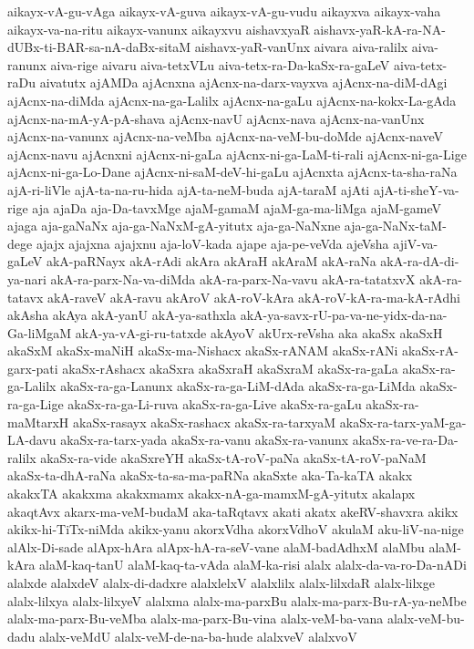 {aikayx-vA-gu-vAga
aikayx-vA-guva
aikayx-vA-gu-vudu
aikayxva
aikayx-vaha
aikayx-va-na-ritu
aikayx-vanunx
aikayxvu
aishavxyaR
aishavx-yaR-kA-ra-NA-dUBx-ti-BAR-sa-nA-daBx-sitaM
aishavx-yaR-vanUnx
aivara
aiva-ralilx
aiva-ranunx
aiva-rige
aivaru
aiva-tetxVLu
aiva-tetx-ra-Da-kaSx-ra-gaLeV
aiva-tetx-raDu
aivatutx
ajAMDa
ajAcnxna
ajAcnx-na-darx-vayxva
ajAcnx-na-diM-dAgi
ajAcnx-na-diMda
ajAcnx-na-ga-Lalilx
ajAcnx-na-gaLu
ajAcnx-na-kokx-La-gAda
ajAcnx-na-mA-yA-pA-shava
ajAcnx-navU
ajAcnx-nava
ajAcnx-na-vanUnx
ajAcnx-na-vanunx
ajAcnx-na-veMba
ajAcnx-na-veM-bu-doMde
ajAcnx-naveV
ajAcnx-navu
ajAcnxni
ajAcnx-ni-gaLa
ajAcnx-ni-ga-LaM-ti-rali
ajAcnx-ni-ga-Lige
ajAcnx-ni-ga-Lo-Dane
ajAcnx-ni-saM-deV-hi-gaLu
ajAcnxta
ajAcnx-ta-sha-raNa
ajA-ri-liVle
ajA-ta-na-ru-hida
ajA-ta-neM-buda
ajA-taraM
ajAti
ajA-ti-sheY-va-rige
aja
ajaDa
aja-Da-tavxMge
ajaM-gamaM
ajaM-ga-ma-liMga
ajaM-gameV
ajaga
aja-gaNaNx
aja-ga-NaNxM-gA-yitutx
aja-ga-NaNxne
aja-ga-NaNx-taM-dege
ajajx
ajajxna
ajajxnu
aja-loV-kada
ajape
aja-pe-veVda
ajeVsha
ajiV-va-gaLeV
akA-paRNayx
akA-rAdi
akAra
akAraH
akAraM
akA-raNa
akA-ra-dA-di-ya-nari
akA-ra-parx-Na-va-diMda
akA-ra-parx-Na-vavu
akA-ra-tatatxvX
akA-ra-tatavx
akA-raveV
akA-ravu
akAroV
akA-roV-kAra
akA-roV-kA-ra-ma-kA-rAdhi
akAsha
akAya
akA-yanU
akA-ya-sathxla
akA-ya-savx-rU-pa-va-ne-yidx-da-na-Ga-liMgaM
akA-ya-vA-gi-ru-tatxde
akAyoV
akUrx-reVsha
aka
akaSx
akaSxH
akaSxM
akaSx-maNiH
akaSx-ma-Nishacx
akaSx-rANAM
akaSx-rANi
akaSx-rA-garx-pati
akaSx-rAshacx
akaSxra
akaSxraH
akaSxraM
akaSx-ra-gaLa
akaSx-ra-ga-Lalilx
akaSx-ra-ga-Lanunx
akaSx-ra-ga-LiM-dAda
akaSx-ra-ga-LiMda
akaSx-ra-ga-Lige
akaSx-ra-ga-Li-ruva
akaSx-ra-ga-Live
akaSx-ra-gaLu
akaSx-ra-maMtarxH
akaSx-rasayx
akaSx-rashacx
akaSx-ra-tarxyaM
akaSx-ra-tarx-yaM-ga-LA-davu
akaSx-ra-tarx-yada
akaSx-ra-vanu
akaSx-ra-vanunx
akaSx-ra-ve-ra-Da-ralilx
akaSx-ra-vide
akaSxreYH
akaSx-tA-roV-paNa
akaSx-tA-roV-paNaM
akaSx-ta-dhA-raNa
akaSx-ta-sa-ma-paRNa
akaSxte
aka-Ta-kaTA
akakx
akakxTA
akakxma
akakxmamx
akakx-nA-ga-mamxM-gA-yitutx
akalapx
akaqtAvx
akarx-ma-veM-budaM
aka-taRqtavx
akati
akatx
akeRV-shavxra
akikx
akikx-hi-TiTx-niMda
akikx-yanu
akorxVdha
akorxVdhoV
akulaM
aku-liV-na-nige
alAlx-Di-sade
alApx-hAra
alApx-hA-ra-seV-vane
alaM-badAdhxM
alaMbu
alaM-kAra
alaM-kaq-tanU
alaM-kaq-ta-vAda
alaM-ka-risi
alalx
alalx-da-va-ro-Da-nADi
alalxde
alalxdeV
alalx-di-dadxre
alalxlelxV
alalxlilx
alalx-lilxdaR
alalx-lilxge
alalx-lilxya
alalx-lilxyeV
alalxma
alalx-ma-parxBu
alalx-ma-parx-Bu-rA-ya-neMbe
alalx-ma-parx-Bu-veMba
alalx-ma-parx-Bu-vina
alalx-veM-ba-vana
alalx-veM-bu-dadu
alalx-veMdU
alalx-veM-de-na-ba-hude
alalxveV
alalxvoV
}
